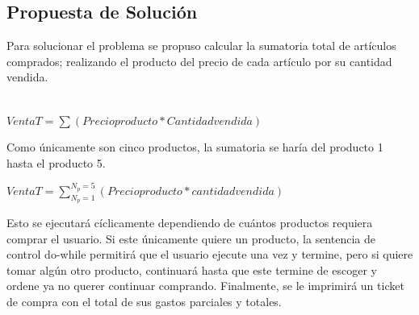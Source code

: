 \documentclass{article}
\begin{document}
\begin{center}
\section{Propuesta de Solución}
    	\end{center}
    Para solucionar el problema se propuso calcular la sumatoria total de artículos comprados; realizando el producto del precio de cada artículo por su cantidad vendida.\\\\
    
                 \begin{center}
                        $VentaT = \sum (Precioproducto*Cantidadvendida)$
                 \end{center}  
        
                 Como únicamente son cinco productos, la sumatoria se haría del producto 1 hasta el producto 5.
        
                \begin{center}
                       $VentaT = \sum\limits_{N_p=1}^{N_p=5} (Precioproducto*cantidadvendida)$
                \end{center}
    
    Esto se ejecutará cíclicamente dependiendo de cuántos productos requiera comprar el usuario. Si este únicamente quiere un producto, la sentencia de control do-while permitirá que el usuario ejecute una vez y termine, pero si quiere tomar algún otro producto, continuará hasta que este termine de escoger y ordene ya no querer continuar comprando. Finalmente, se le imprimirá un ticket de compra con el total de sus gastos parciales y totales.
\end{document}
